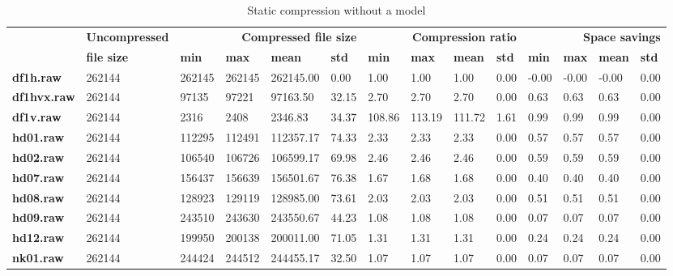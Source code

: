 \begin{table}
\centering
\footnotesize
\begin{tabular}{l|l|llll|llll|llll}
    & \textbf{Uncompressed} & \multicolumn{4}{r|}{\textbf{Compressed file size}} & \multicolumn{4}{r|}{\textbf{Compression ratio}} & \multicolumn{4}{r}{\textbf{Space savings}} \\
    & \textbf{file size} & \textbf{min} & \textbf{max} & \textbf{mean} & \textbf{std} & \textbf{min} & \textbf{max} & \textbf{mean} & \textbf{std} & \textbf{min} & \textbf{max} & \textbf{mean} & \textbf{std} \\
\hline
    \textbf{df1h.raw} & 262144 & 262145 & 262145 & 262145.00 & 0.00 & 1.00 & 1.00 & 1.00 & 0.00 & -0.00 & -0.00 & -0.00 & 0.00 \\
    \textbf{df1hvx.raw} & 262144 & 97135 & 97221 & 97163.50 & 32.15 & 2.70 & 2.70 & 2.70 & 0.00 & 0.63 & 0.63 & 0.63 & 0.00 \\
    \textbf{df1v.raw} & 262144 & 2316 & 2408 & 2346.83 & 34.37 & 108.86 & 113.19 & 111.72 & 1.61 & 0.99 & 0.99 & 0.99 & 0.00 \\
    \textbf{hd01.raw} & 262144 & 112295 & 112491 & 112357.17 & 74.33 & 2.33 & 2.33 & 2.33 & 0.00 & 0.57 & 0.57 & 0.57 & 0.00 \\
    \textbf{hd02.raw} & 262144 & 106540 & 106726 & 106599.17 & 69.98 & 2.46 & 2.46 & 2.46 & 0.00 & 0.59 & 0.59 & 0.59 & 0.00 \\
    \textbf{hd07.raw} & 262144 & 156437 & 156639 & 156501.67 & 76.38 & 1.67 & 1.68 & 1.68 & 0.00 & 0.40 & 0.40 & 0.40 & 0.00 \\
    \textbf{hd08.raw} & 262144 & 128923 & 129119 & 128985.00 & 73.61 & 2.03 & 2.03 & 2.03 & 0.00 & 0.51 & 0.51 & 0.51 & 0.00 \\
    \textbf{hd09.raw} & 262144 & 243510 & 243630 & 243550.67 & 44.23 & 1.08 & 1.08 & 1.08 & 0.00 & 0.07 & 0.07 & 0.07 & 0.00 \\
    \textbf{hd12.raw} & 262144 & 199950 & 200138 & 200011.00 & 71.05 & 1.31 & 1.31 & 1.31 & 0.00 & 0.24 & 0.24 & 0.24 & 0.00 \\
    \textbf{nk01.raw} & 262144 & 244424 & 244512 & 244455.17 & 32.50 & 1.07 & 1.07 & 1.07 & 0.00 & 0.07 & 0.07 & 0.07 & 0.00 \\
\end{tabular}
\caption{Static compression without a model}
\end{table}